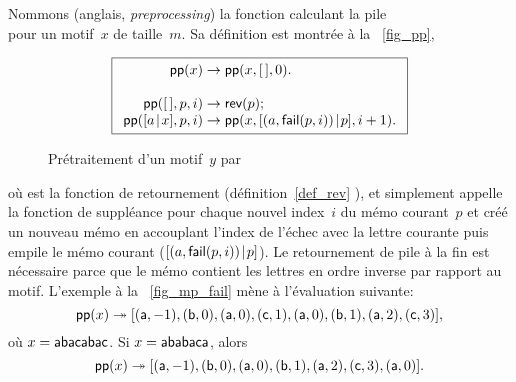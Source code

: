 Nommons  (anglais,
\emph{preprocessing}) la fonction calculant la pile
\begin{equation*}
[\pair{\ind{x}{0}}{\MPfailure{x}{}{0}},
\pair{\ind{x}{1}}{\MPfailure{x}{}{1}}, \dots,
\pair{\ind{x}{m-1}}{\MPfailure{x}{}{m-1}}]
\end{equation*}
pour un motif~\(x\) de taille~\(m\). Sa définition est montrée à la
\fig~\vref{fig_pp},
\begin{figure}[t]
\begin{equation*}
\boxed{%
\begin{array}{r@{\;}l@{\;}l}
\fun{pp}(x) & \rightarrow & \fun{pp}(x,\el,0).\\
\\
\fun{pp}(\el,p,i) & \rightarrow & \fun{rev}(p);\\
\fun{pp}(\cons{a}{x},p,i)
  & \rightarrow
  & \fun{pp}(x,\cons{\pair{a}{\fun{fail}(p,i)}}{p},i+1).
\end{array}}
\end{equation*}
\caption{Prétraitement d'un motif~\(y\) par 
\label{fig_pp}}
\end{figure}
où  est la fonction de retournement
(définition~\eqref{def_rev} ), et
 simplement appelle la fonction de
suppléance  pour chaque nouvel index~\(i\) du mémo
courant~\(p\) et créé un nouveau mémo en accouplant l'index de l'échec
avec la lettre courante puis empile le mémo courant
(\([{({a},{\textsf{fail}(p,i)})}\!\mid\!{p}]\)). Le retournement de pile à
la fin est nécessaire parce que le mémo contient les lettres en ordre
inverse par rapport au motif. L'exemple à la \fig~\vref{fig_mp_fail}
mène à l'évaluation suivante:
\begin{equation*}
\textsf{pp}(x) \twoheadrightarrow
[({\textsf{a}},{-1}), ({\textsf{b}},{0}),
({\textsf{a}},{0}), ({\textsf{c}},{1}),
({\textsf{a}},{0}), ({\textsf{b}},{1}),
({\textsf{a}},{2}), ({\textsf{c}},{3})],
\end{equation*}
où \(x=\textsf{abacabac}\). Si \(x=\textsf{ababaca}\), alors
\begin{equation*}
\abovedisplayskip=2pt
\belowdisplayskip=0pt
\fun{pp}(x) \twoheadrightarrow
[\pair{\word{a}}{-1}, \pair{\word{b}}{0},
\pair{\word{a}}{0}, \pair{\word{b}}{1},
\pair{\word{a}}{2}, \pair{\word{c}}{3},
\pair{\word{a}}{0}].
\end{equation*}

